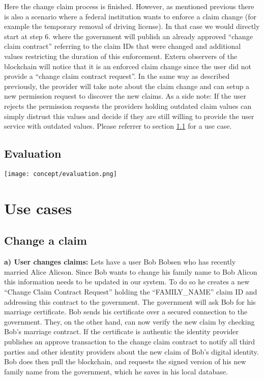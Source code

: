 Here the change claim process is finished. However, as mentioned previous there is also a scenario where a federal institution wants to enforce a claim change (for example the temporary removal of driving license). In that case we would directly start at step 6. where the government will publish an already approved “change claim contract” referring to the claim IDs that were changed and additional values restricting the duration of this enforcement. Extern observers of the blockchain will notice that it is an enforced claim change since the user did not provide a “change claim contract request”. In the same way as described previously, the provider will take note about the claim change and can setup a new permission request to discover the new claims. As a side note: If the user rejects the permission requests the providers holding outdated claim values can simply distrust this values and decide if they are still  willing to provide the user service with outdated values. Please referrer to section \ref{sec:changeClaimUseCase} for a use case.

\subsection{Evaluation}

\texttt{[image: concept/evaluation.png]}
 
\section{Use cases}

\subsection{Change a claim}
\label{sec:changeClaimUseCase}
\textbf{a) User changes claims:}
Lets have a user Bob Bobsen who has recently married Alice Alicson. Since Bob wants to change his family name to Bob Alicon this information needs to be updated in our system. To do so he creates a new “Change Claim Contract Request” holding the “FAMILY\_NAME” claim ID and addressing this contract to the government. The government will ask Bob for his marriage certificate. Bob sends his certificate over a secured connection to the government. They, on the other hand, can now verify the new claim by checking Bob's marriage contract. If the certificate is authentic the identity provider publishes an approve transaction to the change claim contract to notify all third parties and other identity providers about the new claim of Bob's digital identity.
Bob does then pull the blockchain, and requests the signed version of his new family name from the government, which he saves in his local database.


